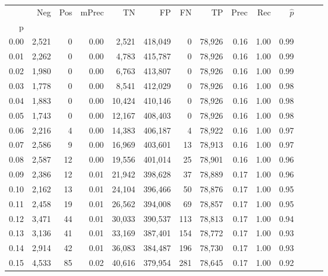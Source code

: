 \begin{tabular}{rrrrrrrrrrrrrr}
\toprule
{} &    Neg &    Pos & mPrec &       TN &       FP &      FN &      TP &  Prec &   Rec & $\hat{p}$ \\
p    &        &        &       &          &          &         &         &       &       &           \\
\midrule
0.00 &  2,521 &      0 &  0.00 &    2,521 &  418,049 &       0 &  78,926 &  0.16 &  1.00 &      0.99 \\
0.01 &  2,262 &      0 &  0.00 &    4,783 &  415,787 &       0 &  78,926 &  0.16 &  1.00 &      0.99 \\
0.02 &  1,980 &      0 &  0.00 &    6,763 &  413,807 &       0 &  78,926 &  0.16 &  1.00 &      0.99 \\
0.03 &  1,778 &      0 &  0.00 &    8,541 &  412,029 &       0 &  78,926 &  0.16 &  1.00 &      0.98 \\
0.04 &  1,883 &      0 &  0.00 &   10,424 &  410,146 &       0 &  78,926 &  0.16 &  1.00 &      0.98 \\
0.05 &  1,743 &      0 &  0.00 &   12,167 &  408,403 &       0 &  78,926 &  0.16 &  1.00 &      0.98 \\
0.06 &  2,216 &      4 &  0.00 &   14,383 &  406,187 &       4 &  78,922 &  0.16 &  1.00 &      0.97 \\
0.07 &  2,586 &      9 &  0.00 &   16,969 &  403,601 &      13 &  78,913 &  0.16 &  1.00 &      0.97 \\
0.08 &  2,587 &     12 &  0.00 &   19,556 &  401,014 &      25 &  78,901 &  0.16 &  1.00 &      0.96 \\
0.09 &  2,386 &     12 &  0.01 &   21,942 &  398,628 &      37 &  78,889 &  0.17 &  1.00 &      0.96 \\
0.10 &  2,162 &     13 &  0.01 &   24,104 &  396,466 &      50 &  78,876 &  0.17 &  1.00 &      0.95 \\
0.11 &  2,458 &     19 &  0.01 &   26,562 &  394,008 &      69 &  78,857 &  0.17 &  1.00 &      0.95 \\
0.12 &  3,471 &     44 &  0.01 &   30,033 &  390,537 &     113 &  78,813 &  0.17 &  1.00 &      0.94 \\
0.13 &  3,136 &     41 &  0.01 &   33,169 &  387,401 &     154 &  78,772 &  0.17 &  1.00 &      0.93 \\
0.14 &  2,914 &     42 &  0.01 &   36,083 &  384,487 &     196 &  78,730 &  0.17 &  1.00 &      0.93 \\
0.15 &  4,533 &     85 &  0.02 &   40,616 &  379,954 &     281 &  78,645 &  0.17 &  1.00 &      0.92 \\

\end{tabular}
